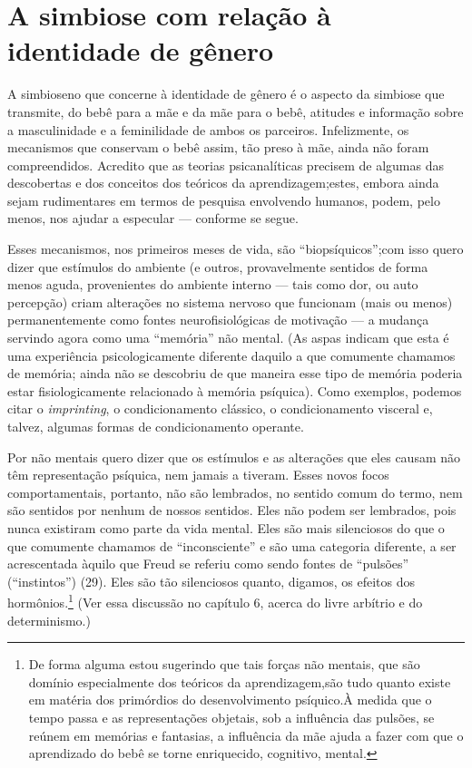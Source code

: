 \section{A simbiose com relação à identidade de gênero}

A simbiose\idxidengen[|(] no que concerne à identidade\idxident{} de gênero é o aspecto da
simbiose\idxfeminsimb{} que transmite, do bebê para a mãe\idxidentsimb{} e da mãe para o bebê,
atitudes e informação sobre a masculinidade e a feminilidade\idxmascufas{} de ambos
os parceiros. Infelizmente, os mecanismos que conservam o bebê assim,
tão preso à mãe, ainda não foram compreendidos. Acredito que as
teorias psicanalíticas precisem de algumas das descobertas e dos
conceitos dos teóricos da aprendizagem;\idxsocia[|(] estes, embora ainda sejam
rudimentares em termos de pesquisa envolvendo humanos, podem, pelo
menos, nos ajudar a especular --- conforme se segue.

Esses mecanismos, nos primeiros meses de vida, são
``biopsíquicos'';\idxmecan[|(] com isso quero dizer que
estímulos do ambiente (e outros, provavelmente sentidos de forma menos
aguda, provenientes do ambiente interno --- tais como dor, ou auto
percepção) criam alterações no sistema nervoso que funcionam (mais ou
menos) permanentemente como fontes neurofisiológicas de motivação ---
a mudança servindo agora como uma ``memória''\idxnaome{}
não mental. (As aspas indicam que esta é uma experiência
psicologicamente diferente daquilo a que comumente chamamos de memória;
ainda não se descobriu de que maneira esse tipo de memória poderia
estar fisiologicamente relacionado à memória psíquica). Como exemplos,
podemos citar o \emph{imprinting},\idxestam{} o condicionamento clássico, o
condicionamento\idxcond{} visceral e, talvez, algumas formas de condicionamento
operante.

Por não mentais quero dizer que os estímulos e as alterações que
eles causam não têm representação psíquica, nem jamais a tiveram. Esses
novos focos comportamentais, portanto, não são lembrados, no sentido
comum do termo, nem são sentidos por nenhum de nossos sentidos. Eles
não podem ser lembrados, pois nunca existiram como parte da vida
mental. Eles são mais silenciosos do que o que comumente chamamos de
``inconsciente'' e são uma categoria
diferente, a ser acrescentada àquilo que Freud\idxfreudinsti{} se referiu como sendo
fontes de ``pulsões'' (``instintos'') (29). Eles são tão
silenciosos quanto, digamos, os efeitos dos hormônios.\footnote{ De
forma alguma estou sugerindo que tais forças não mentais, que são
domínio especialmente dos teóricos da aprendizagem,\idxsocia[|)] são tudo quanto
existe em matéria dos primórdios do desenvolvimento psíquico.\idxmecan[|)] À medida que
o tempo passa e as representações objetais, sob a influência das
pulsões, se reúnem em memórias e fantasias, a influência da mãe ajuda a
fazer com que o aprendizado do bebê se torne enriquecido, cognitivo,
mental.} (Ver essa discussão no capítulo 6, acerca do livre arbítrio e
do determinismo.)

